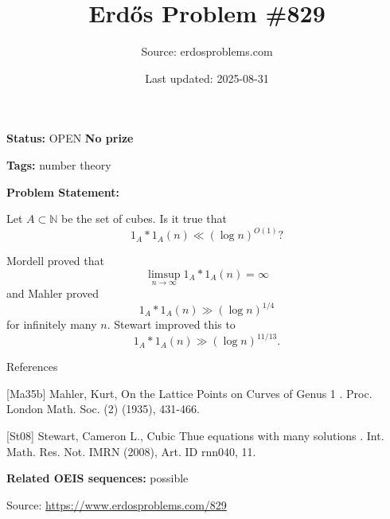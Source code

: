 \documentclass{article}
\title{Erd\H{o}s Problem \#829}
\date{Last updated: 2025-08-31}
\author{Source: erdosproblems.com}
\begin{document}
\maketitle

\noindent\textbf{Status:} OPEN \quad \textbf{No prize}

\noindent\textbf{Tags:} number theory

\medskip

\noindent\textbf{Problem Statement:}

Let $A\subset\mathbb{N}$ be the set of cubes. Is it true that\[1_A\ast 1_A(n) \ll (\log n)^{O(1)}?\]




Mordell proved that\[\limsup_{n\to \infty} 1_A\ast 1_A(n)=\infty\]and Mahler \cite{Ma35b} proved\[1_A\ast 1_A(n) \gg (\log n)^{1/4}\]for infinitely many $n$. Stewart \cite{St08} improved this to\[1_A\ast 1_A(n) \gg (\log n)^{11/13}.\]




References

[Ma35b] Mahler, Kurt, On the Lattice Points on Curves of Genus 1 . Proc. London Math. Soc. (2) (1935), 431-466.

[St08] Stewart, Cameron L., Cubic Thue equations with many solutions . Int. Math. Res. Not. IMRN (2008), Art. ID rnn040, 11.

\noindent\textbf{Related OEIS sequences:} possible


\bigskip
\noindent\small{Source: \url{https://www.erdosproblems.com/829}}
\end{document}

